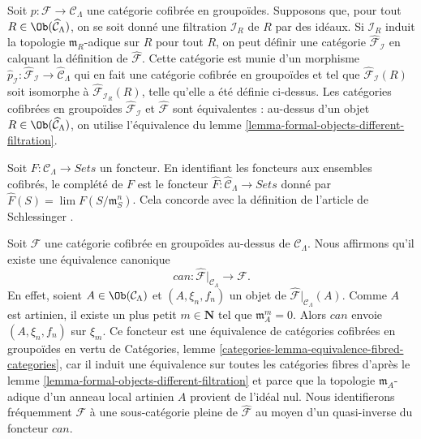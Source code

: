 \begin{remark}
\label{remark-different-sequence-ideals}
Soit $p : \mathcal{F} \to \mathcal{C}_\Lambda$ une catégorie cofibrée en
groupoïdes. Supposons que, pour tout
$R \in \Ob(\widehat{\mathcal{C}}_\Lambda)$, on se soit donné une filtration
$\mathcal{I}_R$ de $R$ par des idéaux. Si $\mathcal{I}_R$ induit la topologie
$\mathfrak m_R$-adique sur $R$ pour tout $R$, on peut définir une catégorie
$\widehat{\mathcal{F}}_\mathcal{I}$ en calquant la définition de
$\widehat{\mathcal{F}}$. Cette catégorie est munie d'un morphisme
$\widehat{p}_\mathcal{I} : \widehat{\mathcal{F}}_\mathcal{I} \to
\widehat{\mathcal{C}}_\Lambda$ qui en fait une catégorie cofibrée en
groupoïdes et tel que $\widehat{\mathcal{F}}_\mathcal{I}(R)$ soit isomorphe à
$\widehat{\mathcal{F}}_{\mathcal{I}_R}(R)$, telle qu'elle a été définie
ci-dessus. Les catégories cofibrées en groupoïdes
$\widehat{\mathcal{F}}_\mathcal{I}$ et $\widehat{\mathcal{F}}$ sont
équivalentes : au-dessus d'un objet
$R \in \Ob(\widehat{\mathcal{C}}_\Lambda)$, on utilise l'équivalence du
lemme \ref{lemma-formal-objects-different-filtration}.
\end{remark}

\begin{remark}
\label{remark-completion-functor}
Soit $F: \mathcal{C}_\Lambda \to \textit{Sets}$ un foncteur. En identifiant
les foncteurs aux ensembles cofibrés, le complété de $F$ est le foncteur
$\widehat{F} : \widehat{\mathcal{C}}_\Lambda \to \textit{Sets}$
donné par $\widehat{F}(S) = \lim F(S/\mathfrak{m}_S^{n})$. Cela concorde avec
la définition de l'article de Schlessinger \cite{Sch}.
\end{remark}

\begin{remark}
\label{remark-restrict-completion}
Soit $\mathcal{F}$ une catégorie cofibrée en groupoïdes au-dessus de
$\mathcal{C}_\Lambda$. Nous affirmons qu'il existe une équivalence canonique
$$
can :
\widehat{\mathcal{F}}|_{\mathcal{C}_\Lambda}
\longrightarrow
\mathcal{F}.
$$
En effet, soient $A \in \Ob(\mathcal{C}_\Lambda)$ et
$(A, \xi_n, f_n)$ un objet de
$\widehat{\mathcal{F}}|_{\mathcal{C}_\Lambda}(A)$. Comme $A$ est artinien,
il existe un plus petit $m \in \mathbf{N}$ tel que
$\mathfrak m_A^m = 0$. Alors $can$ envoie $(A, \xi_n, f_n)$ sur $\xi_m$.
Ce foncteur est une équivalence de catégories cofibrées en groupoïdes en
vertu de Catégories, lemme
\ref{categories-lemma-equivalence-fibred-categories}, car il induit une
équivalence sur toutes les catégories fibres d'après le lemme
\ref{lemma-formal-objects-different-filtration} et parce que la topologie
$\mathfrak m_A$-adique d'un anneau local artinien $A$ provient de l'idéal
nul. Nous identifierons fréquemment $\mathcal{F}$ à une sous-catégorie pleine
de $\widehat{\mathcal{F}}$ au moyen d'un quasi-inverse du foncteur $can$.
\end{remark}

